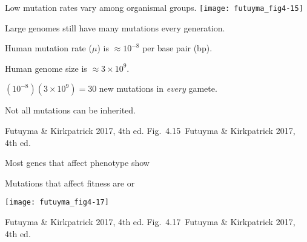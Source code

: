 \documentclass[t]{beamer}
\newcommand{\futuyma}[1]{%
	\ifthenelse{\isempty{#1}}%
	{Futuyma \& Kirkpatrick 2017, 4th ed.}%
	{Fig.~#1~Futuyma \& Kirkpatrick 2017, 4th ed.}%
}
\begin{document}
\begin{frame}[t]{Low mutation rates vary among organismal groups.}
\centering
\texttt{[image: futuyma\_fig4-15]}
\end{frame}

\begin{frame}[t]{Large genomes still have many mutations every generation.}

\hangpara Human mutation rate ($\mu$) is $\approx 10^{-8}$ per base pair (bp).

\hangpara Human genome size is $\approx 3 \times 10^{9}.$

\hangpara $\left(10^{-8}\right)\left(3 \times 10^9\right) = 30$ new mutations in \emph{every} gamete.

\hangpara Not all mutations can be inherited.


\vfilll

\tinyfill \futuyma{4.15}
\end{frame}

%
%
%
%



{
\begin{frame}[t]{Most genes that affect phenotype show }

	
\end{frame}
}


\begin{frame}[t]{Mutations that affect fitness are  or }

\centering

\texttt{[image: futuyma\_fig4-17]}


\tinyfill \futuyma{4.17}

\end{frame}
\end{document}
